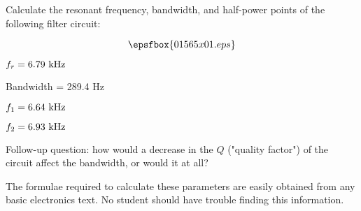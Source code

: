 

Calculate the resonant frequency, bandwidth, and half-power points of the following filter circuit:

$$\epsfbox{01565x01.eps}$$







$f_r = 6.79 \hbox{ kHz}$

\vskip 5pt

Bandwidth = 289.4 Hz

\vskip 5pt

$f_1 = 6.64 \hbox{ kHz}$

\vskip 5pt

$f_2 = 6.93 \hbox{ kHz}$

\vskip 10pt

Follow-up question: how would a decrease in the $Q$ ("quality factor") of the circuit affect the bandwidth, or would it at all?






 
The formulae required to calculate these parameters are easily obtained from any basic electronics text.  No student should have trouble finding this information.




